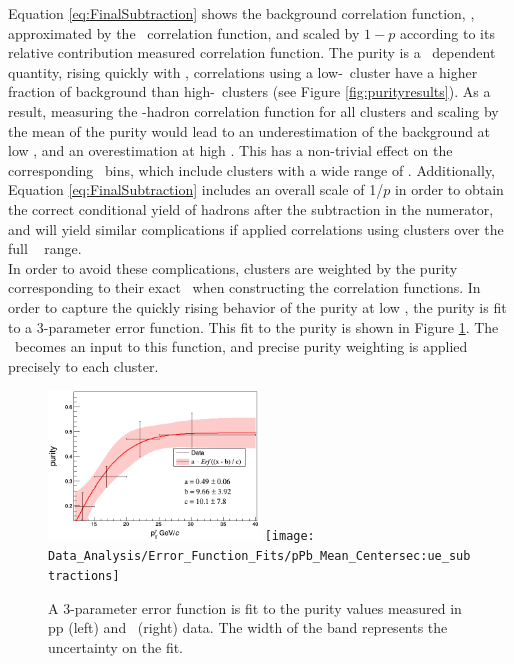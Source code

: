 Equation \ref{eq:FinalSubtraction} shows the background correlation function, \CB, approximated by the \ydecay~correlation function, and scaled by $1-p$ according to its relative contribution measured correlation function. The purity is a \pt~dependent quantity, rising quickly with \pt, correlations using a low-\pt~cluster have a higher fraction of background than high-\pt~clusters (see Figure \ref{fig:purityresults}). As a result, measuring the \ydecay-hadron correlation function for all clusters and scaling by the mean of the purity would lead to an underestimation of the background at low \ptcluster, and an overestimation at high \ptcluster. This has a non-trivial effect on the corresponding \zt~bins, which include clusters with a wide range of \ptcluster. Additionally,  Equation \ref{eq:FinalSubtraction} includes an overall scale of 1/$p$ in order to obtain the correct conditional yield of hadrons after the subtraction in the numerator, and will yield similar complications if applied correlations using clusters over the full \ptcluster~ range.\\

In order to avoid these complications, clusters are weighted by the purity corresponding to their exact \ptcluster~when constructing the correlation functions. In order to capture the quickly rising behavior of the purity at low \ptcluster, the purity is fit to a 3-parameter error function. This fit to the purity is shown in Figure \ref{fig:Purity_Error_Function_analysis}. The \ptcluster~becomes an input to this function, and precise purity weighting is applied precisely to each cluster. 

\begin{figure}
  \includegraphics[width=0.5\textwidth]{Data_Analysis/Error_Function_Fits/pp_Mean_Center}
  \texttt{[image: Data\_Analysis/Error\_Function\_Fits/pPb\_Mean\_Centersec:ue\_subtractions]}
  \caption{A 3-parameter error function is fit to the purity values measured in pp (left) and \pPb~(right) data. The width of the band represents the uncertainty on the fit.}
  \label{fig:Purity_Error_Function_analysis}
\end{figure}


